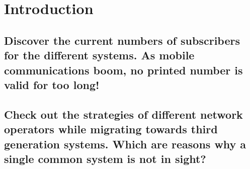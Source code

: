 \section{Introduction}

\subsection{Discover the current numbers of subscribers for the different systems. As mobile
communications boom, no printed number is valid for too long!}

\subsection{Check out the strategies of different network operators while migrating towards third
generation systems. Which are reasons why a single common system is not in sight?}


